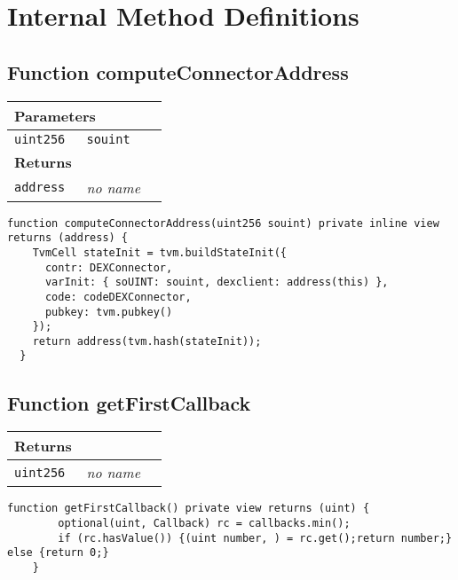 \section{Internal Method Definitions}


\subsection{Function computeConnectorAddress}


\ifsoltables
\noindent\begin{tabular}{|l|l|p{5cm}|}\hline
\multicolumn{3}{|l|}{\bf Parameters}\\\hline
\tt uint256 & \tt souint &\\\hline
\multicolumn{3}{|l|}{\bf Returns}\\\hline
\tt address & {\em no name} &\\\hline
\end{tabular}
\fi

\vspace{2cm}

\begin{lstlisting}[firstnumber=142]
  function computeConnectorAddress(uint256 souint) private inline view returns (address) {
    TvmCell stateInit = tvm.buildStateInit({
      contr: DEXConnector,
      varInit: { soUINT: souint, dexclient: address(this) },
      code: codeDEXConnector,
      pubkey: tvm.pubkey()
    });
    return address(tvm.hash(stateInit));
  }
\end{lstlisting}

\subsection{Function getFirstCallback}


\ifsoltables
\noindent\begin{tabular}{|l|l|p{5cm}|}\hline
\multicolumn{3}{|l|}{\bf Returns}\\\hline
\tt uint256 & {\em no name} &\\\hline
\end{tabular}
\fi

\vspace{2cm}

\begin{lstlisting}[firstnumber=121]
  function getFirstCallback() private view returns (uint) {
		optional(uint, Callback) rc = callbacks.min();
		if (rc.hasValue()) {(uint number, ) = rc.get();return number;} else {return 0;}
	}
\end{lstlisting}

